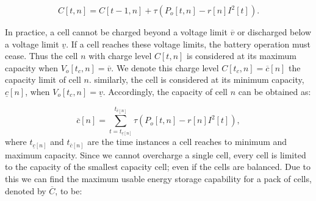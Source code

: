 \documentclass[10pt,twocolumn]{IEEEtran}
\begin{document}
\begin{equation}
C[t,n]=C[t-1,n] +  \tau(P_{o}[t,n] - r[n]I^2[t]).
\label{energycell}
\end{equation}

In practice,  a cell cannot be charged beyond a voltage limit $\overline{v}$ or discharged below a voltage limit $\underline{v}$.
If a cell reaches these voltage limits, the battery operation must cease.
Thus the cell $n$ with charge level  $C[t,n]$ is considered at its maximum capacity when $V_{o}[t_c,n]=\overline{v}$.
We denote this charge level $C[t_c,n]=\overline{c}[n]$  the capacity limit of cell $n$.
similarly, the cell is considered at its minimum capacity, $\underline{c}[n]$, when $V_{o}[t_c,n]=\underline{v}$.
Accordingly, the capacity of cell $n$ can be obtained  as:

\begin{equation}
\overline{c}[n]=   \sum_{t=t_{\underline{c}[n]}}^{t_{\overline{c}[n]} } \tau(P_{o}[t,n] - r[n]I^2[t]),
\end{equation}
\noindent where $t_{\underline{c}[n]}$ and $t_{\overline{c}[n]}$ are the time instances a cell reaches to minimum and maximum capacity.
Since we cannot overcharge a single cell, every cell is limited to the capacity of the smallest capacity cell; even if the cells are balanced.
Due to this we can find the maximum usable energy storage capability for a pack of cells, denoted by $ \overline{C}$,  to be:
\end{document}
